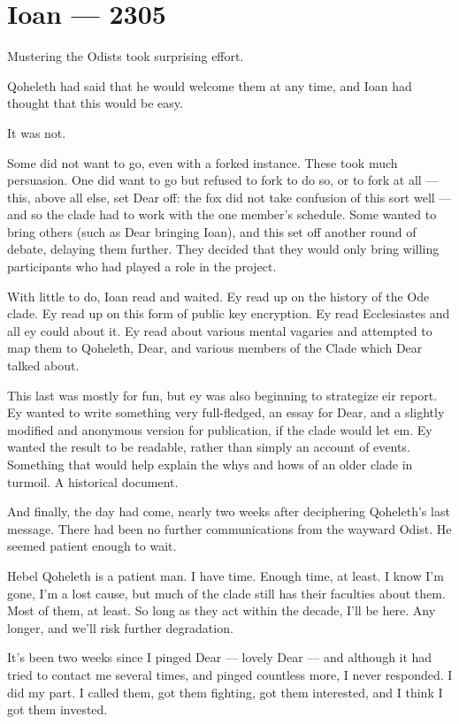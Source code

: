 \chapter*{Ioan — 2305}

Mustering the Odists took surprising effort.

Qoheleth had said that he would welcome them at any time, and Ioan had thought that this would be easy.

It was not.

Some did not want to go, even with a forked instance. These took much persuasion. One did want to go but refused to fork to do so, or to fork at all --- this, above all else, set Dear off: the fox did not take confusion of this sort well --- and so the clade had to work with the one member's schedule. Some wanted to bring others (such as Dear bringing Ioan), and this set off another round of debate, delaying them further. They decided that they would only bring willing participants who had played a role in the project.

With little to do, Ioan read and waited. Ey read up on the history of the Ode clade. Ey read up on this form of public key encryption. Ey read Ecclesiastes and all ey could about it. Ey read about various mental vagaries and attempted to map them to Qoheleth, Dear, and various members of the Clade which Dear talked about.

This last was mostly for fun, but ey was also beginning to strategize eir report. Ey wanted to write something very full-fledged, an essay for Dear, and a slightly modified and anonymous version for publication, if the clade would let em. Ey wanted the result to be readable, rather than simply an account of events. Something that would help explain the whys and hows of an older clade in turmoil. A historical document.

And finally, the day had come, nearly two weeks after deciphering Qoheleth's last message. There had been no further communications from the wayward Odist. He seemed patient enough to wait.

\secdiv{}

\noindent Hebel Qoheleth is a patient man. I have time. Enough time, at least. I know I'm gone, I'm a lost cause, but much of the clade still has their faculties about them. Most of them, at least. So long as they act within the decade, I'll be here. Any longer, and we'll risk further degradation.

It's been two weeks since I pinged Dear --- lovely Dear --- and although it had tried to contact me several times, and pinged countless more, I never responded. I did my part. I called them, got them fighting, got them interested, and I think I got them invested.


